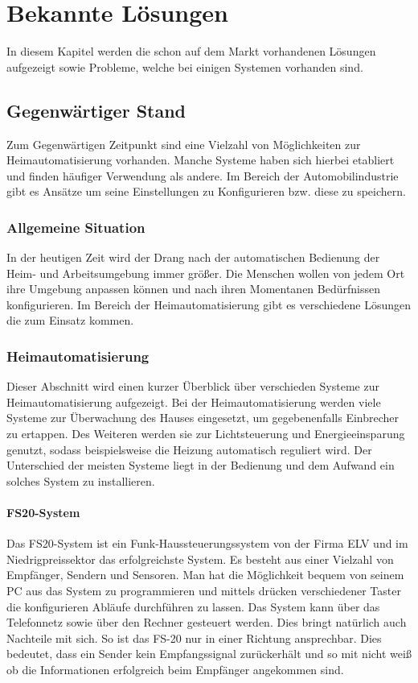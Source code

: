 \chapter{Bekannte Lösungen}
In diesem Kapitel werden die schon auf dem Markt vorhandenen Lösungen aufgezeigt sowie Probleme, welche bei einigen Systemen vorhanden sind.

\section{Gegenwärtiger Stand}
Zum Gegenwärtigen Zeitpunkt sind eine Vielzahl von Möglichkeiten zur Heimautomatisierung vorhanden. 
Manche Systeme haben sich hierbei etabliert und finden häufiger Verwendung als andere. Im Bereich der Automobilindustrie gibt es Ansätze um seine Einstellungen zu Konfigurieren bzw. diese zu speichern.  

\subsection{Allgemeine Situation}
In der heutigen Zeit wird der Drang nach der automatischen Bedienung der Heim- und Arbeitsumgebung immer größer. Die Menschen wollen von jedem Ort ihre Umgebung anpassen können und nach ihren Momentanen Bedürfnissen konfigurieren. Im Bereich der Heimautomatisierung gibt es verschiedene Lösungen die zum 
Einsatz kommen. 

\subsection{Heimautomatisierung}
Dieser Abschnitt wird einen kurzer Überblick über verschieden Systeme zur Heimautomatisierung aufgezeigt. Bei der Heimautomatisierung werden viele Systeme zur Überwachung des Hauses eingesetzt, um gegebenenfalls Einbrecher zu ertappen. Des Weiteren werden sie zur Lichtsteuerung und Energieeinsparung genutzt, sodass beispielsweise die Heizung automatisch reguliert wird. Der Unterschied der meisten Systeme liegt in der Bedienung und dem Aufwand ein solches System zu installieren.  

\subsubsection{FS20-System}
Das FS20-System ist ein Funk-Haussteuerungssystem von der Firma ELV und im Niedrigpreissektor das erfolgreichste System. Es besteht aus einer Vielzahl von Empfänger, Sendern und Sensoren. Man hat die Möglichkeit bequem von seinem PC aus das System zu programmieren und mittels drücken verschiedener Taster die konfigurieren Abläufe durchführen zu lassen. Das System kann über das Telefonnetz sowie über den Rechner gesteuert werden. Dies bringt natürlich auch Nachteile mit sich. So ist das FS-20 nur in einer Richtung ansprechbar. Dies bedeutet, dass ein Sender kein Empfangssignal zurückerhält und so mit nicht weiß ob die Informationen erfolgreich beim Empfänger angekommen sind. 

